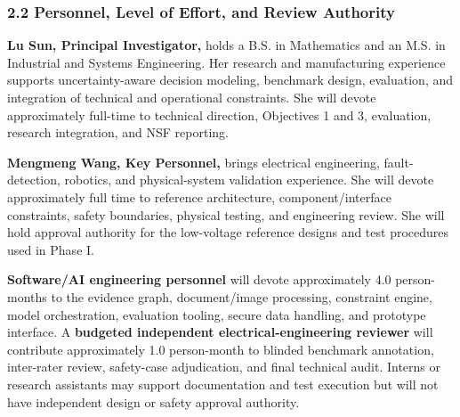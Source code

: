 
\subsubsection*{2.2 Personnel, Level of Effort, and Review Authority}
\textbf{Lu Sun, Principal Investigator,} holds a B.S. in Mathematics and an M.S. in Industrial and Systems Engineering. Her research and manufacturing experience supports uncertainty-aware decision modeling, benchmark design, evaluation, and integration of technical and operational constraints. She will devote approximately full-time to technical direction, Objectives 1 and 3, evaluation, research integration, and NSF reporting.

\textbf{Mengmeng Wang, Key Personnel,} brings electrical engineering, fault-detection, robotics, and physical-system validation experience. She will devote approximately full time to reference architecture, component/interface constraints, safety boundaries, physical testing, and engineering review. She will hold approval authority for the low-voltage reference designs and test procedures used in Phase I.

\textbf{Software/AI engineering personnel} will devote approximately 4.0 person-months to the evidence graph, document/image processing, constraint engine, model orchestration, evaluation tooling, secure data handling, and prototype interface. A \textbf{budgeted independent electrical-engineering reviewer} will contribute approximately 1.0 person-month to blinded benchmark annotation, inter-rater review, safety-case adjudication, and final technical audit. Interns or research assistants may support documentation and test execution but will not have independent design or safety approval authority.

